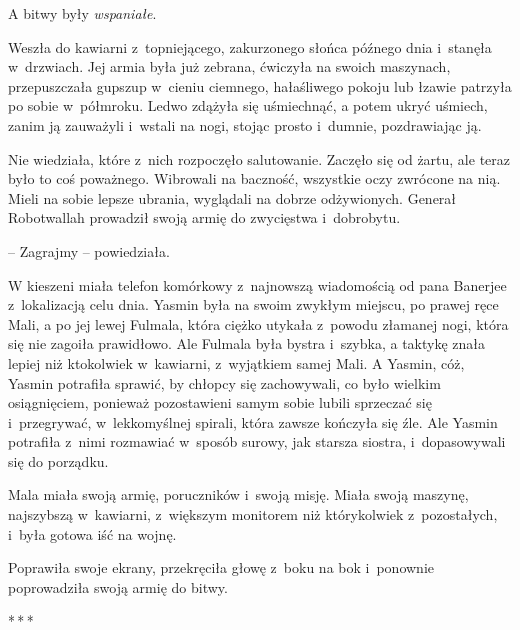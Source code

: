 \documentclass[oneside,polish,11pt,rmheadings]{mwbk}
\newcommand{\threeast}{\par\centerline{*\,*\,*}\medskip\par}
\begin{document}
A bitwy były \textit{wspaniałe}. 


Weszła do kawiarni z~topniejącego, zakurzonego słońca późnego dnia i~stanęła w~drzwiach. Jej armia była już zebrana, ćwiczyła na swoich maszynach, przepuszczała gupszup w~cieniu ciemnego, hałaśliwego pokoju lub łzawie patrzyła po sobie w~półmroku. Ledwo zdążyła się uśmiechnąć, a potem ukryć uśmiech, zanim ją zauważyli i~wstali na nogi, stojąc prosto i~dumnie, pozdrawiając ją. 


Nie wiedziała, które z~nich rozpoczęło salutowanie. Zaczęło się od żartu, ale teraz było to coś poważnego. Wibrowali na baczność, wszystkie oczy zwrócone na nią. Mieli na sobie lepsze ubrania, wyglądali na dobrze odżywionych. Generał Robotwallah prowadził swoją armię do zwycięstwa i~dobrobytu. 


-- Zagrajmy -- powiedziała.

W kieszeni miała telefon komórkowy z~najnowszą wiadomością od pana Banerjee z~lokalizacją celu dnia. Yasmin była na swoim zwykłym miejscu, po prawej ręce Mali, a po jej lewej Fulmala, która ciężko utykała z~powodu złamanej nogi, która się nie zagoiła prawidłowo. Ale Fulmala była bystra i~szybka, a taktykę znała lepiej niż ktokolwiek w~kawiarni, z~wyjątkiem samej Mali. A Yasmin, cóż, Yasmin potrafiła sprawić, by chłopcy się zachowywali, co było wielkim osiągnięciem, ponieważ pozostawieni samym sobie lubili sprzeczać się i~przegrywać, w~lekkomyślnej spirali, która zawsze kończyła się źle. Ale Yasmin potrafiła z~nimi rozmawiać w~sposób surowy, jak starsza siostra, i~dopasowywali się do porządku. 


Mala miała swoją armię, poruczników i~swoją misję. Miała swoją maszynę, najszybszą w~kawiarni, z~większym monitorem niż którykolwiek z~pozostałych, i~była gotowa iść na wojnę. 


Poprawiła swoje ekrany, przekręciła głowę z~boku na bok i~ponownie poprowadziła swoją armię do bitwy. 


\bigskip
\threeast
\end{document}
